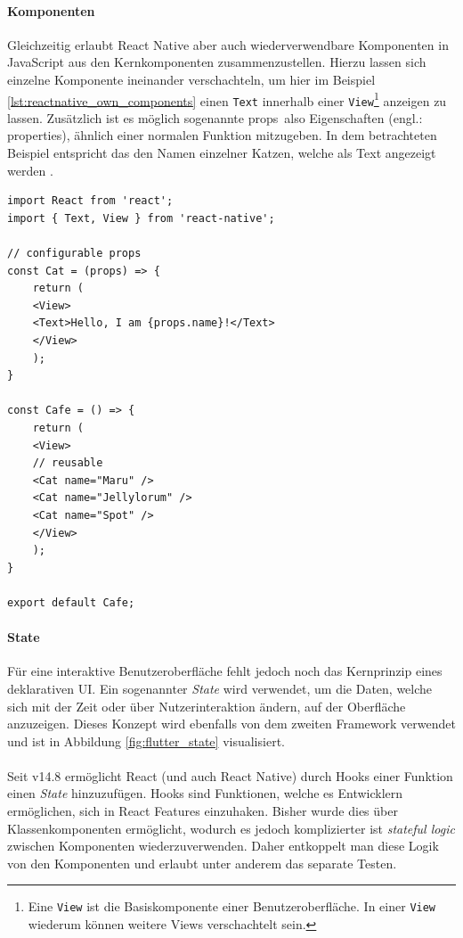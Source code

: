 \paragraph{Komponenten}
Gleichzeitig erlaubt React Native aber auch wiederverwendbare Komponenten in JavaScript aus den Kernkomponenten zusammenzustellen.
Hierzu lassen sich einzelne Komponente ineinander verschachteln, um hier im Beispiel \ref{lst:reactnative_own_components} einen \texttt{Text} innerhalb einer \texttt{View}\footnote{Eine \texttt{View} ist die Basiskomponente einer Benutzeroberfläche. In einer \texttt{View} wiederum können weitere Views verschachtelt sein.} anzeigen zu lassen.
Zusätzlich ist es möglich sogenannte \glqq props\grqq \, also Eigenschaften (engl.: properties), ähnlich einer normalen Funktion mitzugeben.
In dem betrachteten Beispiel entspricht das den Namen einzelner Katzen, welche als Text angezeigt werden \cite{reactnative2021}.\\

\begin{lstlisting}[caption=Eigene Komponenten, label=lst:reactnative_own_components]
import React from 'react';
import { Text, View } from 'react-native';

// configurable props
const Cat = (props) => {
	return (
	<View>
	<Text>Hello, I am {props.name}!</Text>
	</View>
	);
}

const Cafe = () => {
	return (
	<View>
	// reusable
	<Cat name="Maru" />
	<Cat name="Jellylorum" />
	<Cat name="Spot" />
	</View>
	);
}

export default Cafe;
\end{lstlisting}


\paragraph{State}
Für eine interaktive Benutzeroberfläche fehlt jedoch noch das Kernprinzip eines deklarativen UI. Ein sogenannter \textit{State} wird verwendet, um die Daten, welche sich mit der Zeit oder über Nutzerinteraktion ändern, auf der Oberfläche anzuzeigen. Dieses Konzept wird ebenfalls von dem zweiten Framework verwendet und ist in Abbildung \ref{fig:flutter_state} visualisiert.\\
\\
Seit v14.8 ermöglicht React (und auch React Native)  durch Hooks einer Funktion einen \textit{State} hinzuzufügen. Hooks sind Funktionen, welche es Entwicklern ermöglichen, sich in React Features einzuhaken. Bisher wurde dies über Klassenkomponenten ermöglicht, wodurch es jedoch komplizierter ist \textit{stateful logic} zwischen Komponenten wiederzuverwenden. Daher entkoppelt man diese Logik von den Komponenten und erlaubt unter anderem das separate Testen.\\

